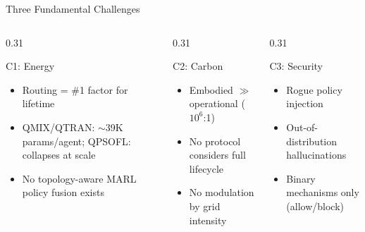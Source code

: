 \documentclass[10pt,aspectratio=169]{beamer}
\begin{document}
\begin{frame}[t]{Three Fundamental Challenges}
\begin{columns}[T]
\begin{column}{0.31\textwidth}
  \begin{block}{\faLightbulb\; C1: Energy}
    \begin{itemize}\footnotesize\setlength{\itemsep}{1pt}
      \item Routing = \#1 factor for lifetime
      \item QMIX/QTRAN: $\sim$39K params/agent; QPSOFL: collapses at scale
      \item No topology-aware MARL policy fusion exists
    \end{itemize}
  \end{block}
\end{column}
\begin{column}{0.31\textwidth}
  \begin{block}{\faLeaf\; C2: Carbon}
    \begin{itemize}\footnotesize\setlength{\itemsep}{1pt}
      \item Embodied $\gg$ operational ($10^6$:1)
      \item No protocol considers full lifecycle
      \item No modulation by grid intensity
    \end{itemize}
  \end{block}
\end{column}
\begin{column}{0.31\textwidth}
  \begin{block}{\faLock\; C3: Security}
    \begin{itemize}\footnotesize\setlength{\itemsep}{1pt}
      \item Rogue policy injection
      \item Out-of-distribution hallucinations
      \item Binary mechanisms only (allow/block)
    \end{itemize}
  \end{block}
\end{column}
\end{columns}
\end{frame}
\end{document}
